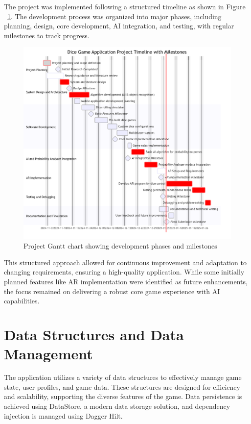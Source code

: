 The project was implemented following a structured timeline as shown in Figure ~\ref{fig:gantt}. The development process was organized into major phases, including planning, design, core development, AI integration, and testing, with regular milestones to track progress.

\begin{figure}[ht!]
    \centering
    \includegraphics[width=\textwidth]{img/gantt_chart.png}
    \caption{Project Gantt chart showing development phases and milestones}
    \label{fig:gantt}
\end{figure}

This structured approach allowed for continuous improvement and adaptation to changing requirements, ensuring a high-quality application. While some initially planned features like AR implementation were identified as future enhancements, the focus remained on delivering a robust core game experience with AI capabilities.

\section{Data Structures and Data Management}

The application utilizes a variety of data structures to effectively manage game state, user profiles, and game data. These structures are designed for efficiency and scalability, supporting the diverse features of the game. Data persistence is achieved using DataStore, a modern data storage solution, and dependency injection is managed using Dagger Hilt.


